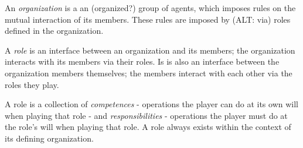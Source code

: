 An \textit{organization} is a an (organized?) group of agents, which imposes rules on the mutual interaction of its members. 
These rules are imposed by (ALT: via) roles defined in the organization.

A \textit{role} is an interface between an organization and its members; the organization interacts with its members via their roles.
Is is also an interface between the organization members themselves; the members interact with each other via the roles they play.

A role is a collection of \textit{competences} - operations the player can do at its own will when playing that role - and \textit{responsibilities} - operations the player must do at the role's will when playing that role.
A role always exists within the context of its defining organization.

